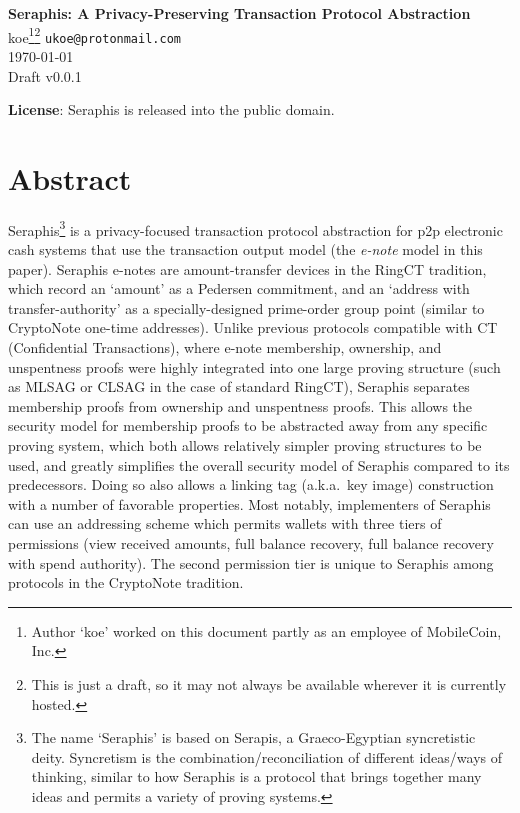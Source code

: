 \textbf{Seraphis: A Privacy-Preserving Transaction Protocol Abstraction}\\
koe\footnote{Author `koe' worked on this document partly as an employee of MobileCoin, Inc.}\footnote{This is just a draft, so it may not always be available wherever it is currently hosted.} \texttt{ukoe@protonmail.com}\\
\today\\
Draft v0.0.1

\textbf{License}: Seraphis is released into the public domain.

\section{Abstract}
\label{sec:abstract}

Seraphis\footnote{The name `Seraphis' is based on Serapis, a Graeco-Egyptian syncretistic deity. Syncretism is the combination/reconciliation of different ideas/ways of thinking, similar to how Seraphis is a protocol that brings together many ideas and permits a variety of proving systems.} is a privacy-focused transaction protocol abstraction for p2p electronic cash systems that use the transaction output model (the {\em e-note} model in this paper). Seraphis e-notes are amount-transfer devices in the RingCT tradition, which record an `amount' as a Pedersen commitment, and an `address with transfer-authority' as a specially-designed prime-order group point (similar to CryptoNote one-time addresses). Unlike previous protocols compatible with CT (Confidential Transactions), where e-note membership, ownership, and unspentness proofs were highly integrated into one large proving structure (such as MLSAG or CLSAG in the case of standard RingCT), Seraphis separates membership proofs from ownership and unspentness proofs. This allows the security model for membership proofs to be abstracted away from any specific proving system, which both allows relatively simpler proving structures to be used, and greatly simplifies the overall security model of Seraphis compared to its predecessors. Doing so also allows a linking tag (a.k.a.\ key image) construction with a number of favorable properties. Most notably, implementers of Seraphis can use an addressing scheme which permits wallets with three tiers of permissions (view received amounts, full balance recovery, full balance recovery with spend authority). The second permission tier is unique to Seraphis among protocols in the CryptoNote tradition.



